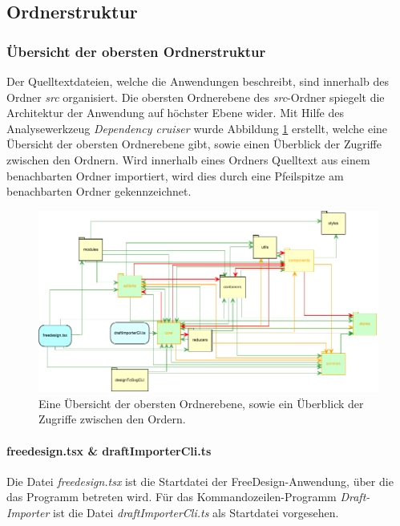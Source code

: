 \subsection{Ordnerstruktur}

\subsubsection{Übersicht der obersten Ordnerstruktur}
Der Quelltextdateien, welche die Anwendungen beschreibt, sind innerhalb des Ordner \textit{src} organisiert. 
Die obersten Ordnerebene des \textit{src}-Ordner spiegelt die Architektur der Anwendung auf höchster Ebene wider. 
Mit Hilfe des Analysewerkzeug \textit{Dependency cruiser} wurde Abbildung \ref{fig:obersteOrdnerebene}  erstellt, welche eine Übersicht der obersten Ordnerebene gibt, sowie einen Überblick der Zugriffe zwischen den Ordnern. Wird innerhalb eines Ordners Quelltext aus einem benachbarten Ordner importiert, wird dies durch eine Pfeilspitze am benachbarten Ordner gekennzeichnet. 

\begin{figure}[H]
	\centering
	\includegraphics{diagrams/Ist-Architektur/high-level-graph.pdf}
	\caption{Eine Übersicht der obersten Ordnerebene, sowie ein Überblick der Zugriffe zwischen den Ordern.}
	\label{fig:obersteOrdnerebene}
\end{figure}


\paragraph{freedesign.tsx \& draftImporterCli.ts}
Die Datei \textit{freedesign.tsx} ist die Startdatei der FreeDesign-Anwendung, über die das Programm betreten wird. Für das Kommandozeilen-Programm \textit{Draft-Importer} ist die Datei \textit{draftImporterCli.ts} als Startdatei vorgesehen. 

